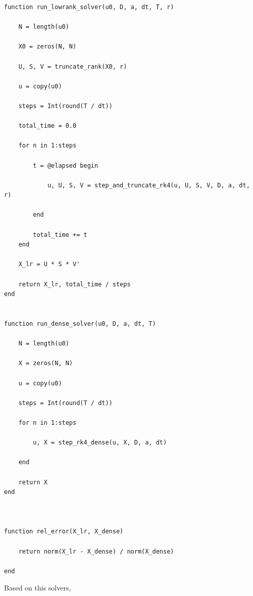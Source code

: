 \documentclass[11pt]{report}
\begin{document}
\begin{lstlisting}
function run_lowrank_solver(u0, D, a, dt, T, r)

    N = length(u0)

    X0 = zeros(N, N)

    U, S, V = truncate_rank(X0, r)

    u = copy(u0)

    steps = Int(round(T / dt))

    total_time = 0.0

    for n in 1:steps

        t = @elapsed begin

            u, U, S, V = step_and_truncate_rk4(u, U, S, V, D, a, dt, r)

        end

        total_time += t
    end

    X_lr = U * S * V'

    return X_lr, total_time / steps
end


function run_dense_solver(u0, D, a, dt, T)

    N = length(u0)

    X = zeros(N, N)

    u = copy(u0)

    steps = Int(round(T / dt))

    for n in 1:steps

        u, X = step_rk4_dense(u, X, D, a, dt)

    end

    return X
end



function rel_error(X_lr, X_dense)

    return norm(X_lr - X_dense) / norm(X_dense)

end
\end{lstlisting}

Based on this solvers,
\end{document}

